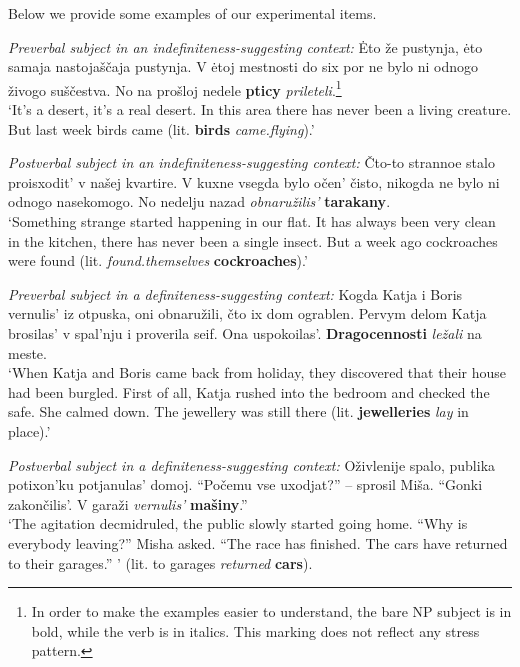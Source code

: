 \documentclass[output=paper]{langsci/langscibook}
\begin{document}
\largerpage[2]
Below we provide some examples of our experimental items. 

\begin{exe}
\ex\label{2ex:14}
{\emph{Preverbal subject in an indefiniteness-suggesting context:}}
\exi{}
{
Ėto \v{z}e pustynja, ėto samaja nastoja\v{s}\v{c}aja pustynja. 
V ėtoj mestnosti do six por ne bylo ni odnogo \v{z}ivogo su\v{s}\v{c}estva. 
No na pro\v{s}loj nedele {\textbf{pticy}} {\emph{prileteli}}}.\footnote{In order to make the examples easier to understand, the bare NP subject is in bold, while the verb is in italics. This marking does not reflect any stress pattern.}\\
`It's a desert, it's a real desert. In this area there has never been a living creature. But last week birds came (lit. {\textbf{birds}} {\emph{came.flying}}).'

\ex\label{2ex:15}
{\emph{Postverbal subject in an indefiniteness-suggesting context:}}
\exi{}
\v{C}to-to strannoe stalo proisxodit' v na\v{s}ej kvartire. 
V kuxne vsegda bylo o\v{c}en' \v{c}isto, nikogda ne bylo ni odnogo nasekomogo. 
No nedelju nazad {\emph{obnaru\v{z}ilis'}} {\textbf{tarakany}}. \\
`Something strange started happening in our flat. It has always been very clean in the kitchen, there has never been a single insect. But a week ago cockroaches were found (lit. {\emph{found.themselves}} {\textbf{cockroaches}}).'

\ex\label{2ex:16}
{\emph{Preverbal subject in a definiteness-suggesting context:}}
\exi{}
Kogda Katja i Boris vernulis' iz otpuska, oni obnaru\v{z}ili, \v{c}to ix dom ograblen. 
Pervym delom Katja brosilas' v spal'nju i proverila seif. 
Ona uspokoilas'. 
{\textbf{Dragocennosti}} {\emph{le\v{z}ali}} na meste. \\
`When Katja and Boris came back from holiday, they discovered that their house had been burgled. First of all, Katja rushed into the bedroom and checked the safe. She calmed down. The jewellery was still there (lit. {\textbf{jewelleries}} {\emph{lay}} in place).'

\ex\label{2ex:17}
{\emph{Postverbal subject in a definiteness-suggesting context:}}
\exi{}
O\v{z}ivlenije spalo, publika potixon'ku potjanulas' domoj. 
``Po\v{c}emu vse uxodjat?'' -- sprosil Mi\v{s}a. 
``Gonki zakon\v{c}ilis'. V gara\v{z}i {\emph{vernulis'}} {\textbf{ma\v{s}iny}}.'' \\
`The agitation decmidruled, the public slowly started going home. ``Why is everybody leaving?'' Misha asked. ``The race has finished. The cars have returned to their garages.'' ' (lit. to garages {\emph{returned}} {\textbf{cars}}).
\end{exe}
\end{document}
